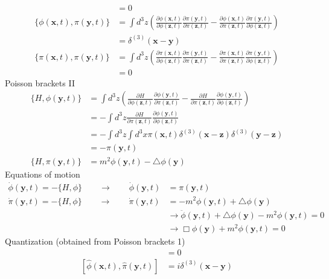 \documentclass[10pt,a4paper]{report}
\theoremstyle{definition}
\begin{document}
\begin{enumerate}[a)]
\begin{align}
&=0\\
\{\phi(\mathbf{x},t),\pi(\mathbf{y},t)\}
&=\int d^3z\left(\frac{\partial\phi(\mathbf{x},t)}{\partial\phi(\mathbf{z},t)}\frac{\partial \pi(\mathbf{y},t)}{\partial\pi(\mathbf{z},t)}-\frac{\partial\phi(\mathbf{x},t)}{\partial\pi(\mathbf{z},t)}\frac{\partial \pi(\mathbf{y},t)}{\partial\phi(\mathbf{z},t)}\right)\\
&=\delta^{(3)}(\mathbf{x}-\mathbf{y})\\
\{\pi(\mathbf{x},t),\pi(\mathbf{y},t)\}
&=\int d^3z\left(\frac{\partial\pi(\mathbf{x},t)}{\partial\phi(\mathbf{z},t)}\frac{\partial \pi(\mathbf{y},t)}{\partial\pi(\mathbf{z},t)}-\frac{\partial\pi(\mathbf{x},t)}{\partial\pi(\mathbf{z},t)}\frac{\partial\pi(\mathbf{y},t)}{\partial\phi(\mathbf{z},t)}\right)\\
&=0
\end{align}
Poisson brackets II
\begin{align}
\{H,\phi(\mathbf{y},t)\}
&=\int d^3z\left(\frac{\partial H}{\partial\phi(\mathbf{z},t)}\frac{\partial \phi(\mathbf{y},t)}{\partial\pi(\mathbf{z},t)}-\frac{\partial H}{\partial\pi(\mathbf{z},t)}\frac{\partial \phi(\mathbf{y},t)}{\partial\phi(\mathbf{z},t)}\right)\\
&=-\int d^3z\frac{\partial H}{\partial\pi(\mathbf{z},t)}\frac{\partial \phi(\mathbf{y},t)}{\partial\phi(\mathbf{z},t)}\\
&=-\int d^3z \int d^3x \pi(\mathbf{x},t) \delta^{(3)}(\mathbf{x}-\mathbf{z})\delta^{(3)}(\mathbf{y}-\mathbf{z})\\
&=-\pi(\mathbf{y},t)\\
\{H,\pi(\mathbf{y},t)\}
&=m^2\phi(\mathbf{y},t)-\triangle\phi(\mathbf{y})
\end{align}
Equations of motion
\begin{align}
\dot{\phi}(\mathbf{y},t)=-\{H,\phi\}\qquad\rightarrow\qquad\dot{\phi}(\mathbf{y},t)
&=\pi(\mathbf{y},t)\\
\dot{\pi}(\mathbf{y},t)=-\{H,\phi\}\qquad\rightarrow\qquad\dot{\pi}(\mathbf{y},t)
&=-m^2\phi(\mathbf{y},t)+\triangle\phi(\mathbf{y})\\
&\rightarrow \ddot{\phi}(\mathbf{y},t)+\triangle\phi(\mathbf{y})-m^2\phi(\mathbf{y},t)=0\\
&\rightarrow \Box\phi(\mathbf{y})+m^2\phi(\mathbf{y},t)=0
\end{align}
Quantization (obtained from Poisson brackets 1)
\begin{align}
[\hat{\phi}(\mathbf{x},t),\hat{\phi}(\mathbf{y},t)]&=0\\
[\hat{\phi}(\mathbf{x},t),\hat{\pi}(\mathbf{y},t)]&=i\delta^{(3)}(\mathbf{x}-\mathbf{y})\\

\end{align}
\end{enumerate}
\end{document}
